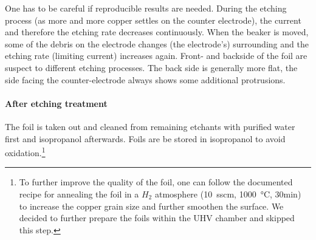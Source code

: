	One has to be careful if reproducible results are needed. During the etching process (as more and more copper settles on the counter electrode), the current and therefore the etching rate decreases continuously. When the beaker is moved, some of the debris on the electrode changes (the electrode's) surrounding and the etching rate (limiting current) increases again. 
	Front- and backside of the foil are suspect to different etching processes. The back side is generally more flat, the side facing the counter-electrode always shows some additional protrusions.
	
	\paragraph{After etching treatment}
	The foil is taken out and cleaned from remaining etchants with purified water first and isopropanol afterwards. Foils are be stored in isopropanol to avoid oxidation.\footnote{To further improve the quality of the foil, one can follow the documented recipe for annealing the foil in a $H_2$ atmosphere (\SI{10}{sscm}, \SI{1000}{\celsius}, 30min)\cite{kim_synthesis_2012} to increase the copper grain size and further smoothen the surface. We decided to further prepare the foils within the UHV chamber and skipped this step.}
	
%	
	
